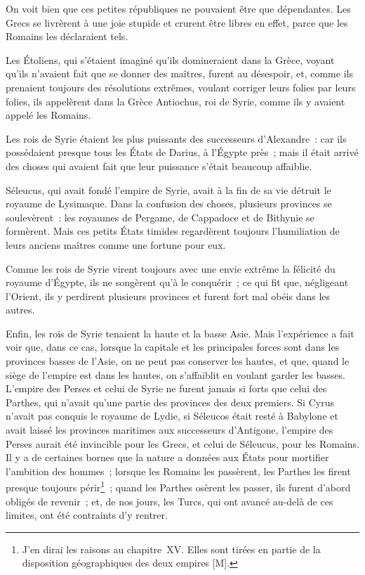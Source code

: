 \documentclass[french,twoside]{book} %
\begin{document}
On voit bien que ces petites républiques ne pouvaient être que dépendantes. Les Grecs se livrèrent à une joie stupide et crurent être libres en effet, parce que les Romains les déclaraient tels.\par
Les Étoliens, qui s’étaient imaginé qu’ils domineraient dans la Grèce, voyant qu’ils n’avaient fait que se donner des maîtres, furent au désespoir, et, comme ils prenaient toujours des résolutions extrêmes, voulant corriger leurs folies par leurs folies, ils appelèrent dans la Grèce Antiochus, roi de Syrie, comme ils y avaient appelé les Romains.\par
Les rois de Syrie étaient les plus puissants des successeurs d’Alexandre : car ils possédaient presque tous les États de Darius, à l’Égypte près ; mais il était arrivé des choses qui avaient fait que leur puissance s’était beaucoup affaiblie.\par
Séleucus, qui avait fondé l’empire de Syrie, avait à la fin de sa vie détruit le royaume de Lysimaque. Dans la confusion des choses, plusieurs provinces se soulevèrent : les royaumes de Pergame, de Cappadoce et de Bithynie se formèrent. Mais ces petits États timides regardèrent toujours l’humiliation de leurs anciens maîtres comme une fortune pour eux.\par
Comme les rois de Syrie virent toujours avec une envie extrême la félicité du royaume d’Égypte, ils ne songèrent qu’à le conquérir ; ce qui fit que, négligeant l’Orient, ils y perdirent plusieurs provinces et furent fort mal obéis dans les autres.\par
Enfin, les rois de Syrie tenaient la haute et la basse Asie. Mais l’expérience a fait voir que, dans ce cas, lorsque la capitale et les principales forces sont dans les provinces basses de l’Asie, on ne peut pas conserver les hautes, et que, quand le siège de l’empire est dans les hautes, on s’affaiblit en voulant garder les basses. L’empire des Perses et celui de Syrie ne furent jamais si forts que celui des Parthes, qui n’avait qu’une partie des provinces des deux premiers. Si Cyrus n’avait pas conquis le royaume de Lydie, si Séleucos était resté à Babylone et avait laissé les provinces maritimes aux successeurs d’Antigone, l’empire des Perses aurait été invincible pour les Grecs, et celui de Séleucus, pour les Romains. Il y a de certaines bornes que la nature a données aux États pour mortifier l’ambition des hommes ; lorsque les Romains les passèrent, les Parthes les firent presque toujours périr\footnote{J’en dirai les raisons au chapitre XV. Elles sont tirées en partie de la disposition géographiques des deux empires [M].} ; quand les Parthes osèrent les passer, ils furent d’abord obligés de revenir ; et, de nos jours, les Turcs, qui ont avancé au-delà de ces limites, ont été contraints d’y rentrer.\par
\end{document}
